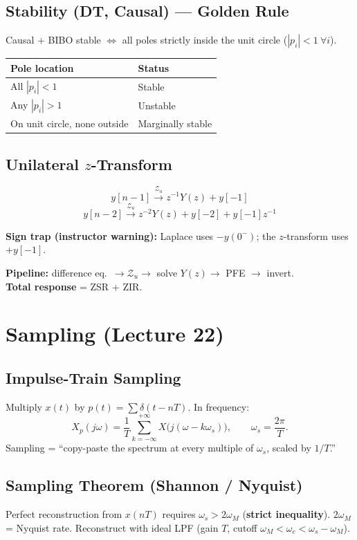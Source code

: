 \documentclass[11pt]{article}
\begin{document}
\subsection{Stability (DT, Causal) --- Golden Rule}
Causal + BIBO stable $\iff$ all poles strictly inside the unit circle ($|p_i| < 1\ \forall i$).

\begin{center}
\begin{tabular}{ll}
\toprule
Pole location & Status \\
\midrule
All $|p_i| < 1$ & Stable \\
Any $|p_i| > 1$ & Unstable \\
On unit circle, none outside & Marginally stable \\
\bottomrule
\end{tabular}
\end{center}

\subsection{Unilateral $z$-Transform}
\[ y[n-1] \xrightarrow{\mathcal{Z}_u} z^{-1} Y(z) + y[-1] \]
\[ y[n-2] \xrightarrow{\mathcal{Z}_u} z^{-2} Y(z) + y[-2] + y[-1] z^{-1} \]

\noindent\textbf{Sign trap (instructor warning):} Laplace uses $-y(0^-)$; the $z$-transform uses $+y[-1]$.

\textbf{Pipeline:} difference eq.\ $\to \mathcal{Z}_u \to$ solve $Y(z) \to$ PFE $\to$ invert. \\
\textbf{Total response} = ZSR + ZIR.

\section{Sampling (Lecture 22)}

\subsection{Impulse-Train Sampling}
Multiply $x(t)$ by $p(t) = \sum \delta(t - nT)$. In frequency:
\[ X_p(j\omega) = \frac{1}{T} \sum_{k=-\infty}^{+\infty} X\bigl(j(\omega - k\omega_s)\bigr), \qquad \omega_s = \frac{2\pi}{T}. \]
Sampling = ``copy-paste the spectrum at every multiple of $\omega_s$, scaled by $1/T$.''

\subsection{Sampling Theorem (Shannon / Nyquist)}
Perfect reconstruction from $x(nT)$ requires $\omega_s > 2\omega_M$ (\textbf{strict inequality}). $2\omega_M$ = Nyquist rate. Reconstruct with ideal LPF (gain $T$, cutoff $\omega_M < \omega_c < \omega_s - \omega_M$).
\end{document}
